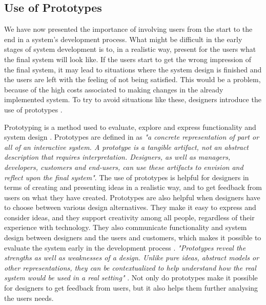\subsection{Use of Prototypes}
\label{sec:prototypes}
We have now presented the importance of involving users from the start to the end in a system's development process. What might be difficult in the early stages of system development is to, in a realistic way, present for the users what the final system will look like. If the users start to get the wrong impression of the final system, it may lead to situations where the system design is finished and the users are left with the feeling of not being satisfied. This would be a problem, because of the high costs associated to making changes in the already implemented system. To try to avoid situations like these, designers introduce the use of prototypes \cite{mmi}. 

Prototyping is a method used to evaluate, explore and express functionality and system design \cite{houde1997prototypes}. Prototypes are defined in \cite{mackayprototyping} as \emph{"a concrete representation of part or all of an interactive system. A prototype is a tangible artifact, not an abstract description that requires interpretation. Designers, as well as managers, developers, customers and end-users, can use these artifacts to envision and reflect upon the final system"}. The use of prototypes is helpful for designers in terms of creating and presenting ideas in a realistic way, and to get feedback from users on what they have created. Prototypes are also helpful when designers have to choose between various design alternatives. They make it easy to express and consider ideas, and they support creativity among all people, regardless of their experience with technology. They also communicate functionality and system design between designers and the users and customers, which makes it possible to evaluate the system early in the development process \cite{mackayprototyping} \cite{mmi}. \emph{"Prototypes reveal the strengths as well as weaknesses of a design. Unlike pure ideas, abstract models or other representations, they can be contextualized to help understand how the real system would be used in a real setting"} \cite{mackayprototyping}. Not only do prototypes make it possible for designers to get feedback from users, but it also helps them further analysing the users needs. 

